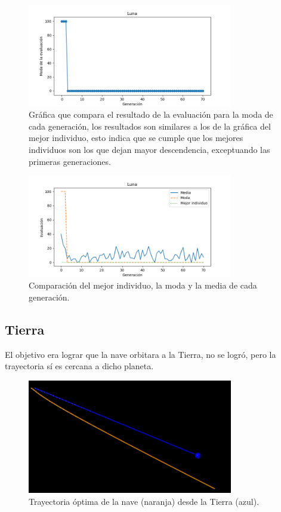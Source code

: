 \documentclass[12pt,letterpaper]{article}
\begin{document}
\begin{figure}[H]
\centering
\includegraphics[width=0.8\textwidth]{Lunamoda}
\caption{Gráfica que compara el resultado de la evaluación para la moda de cada generación, los resultados son similares a los de la gráfica del mejor individuo, esto indica que se cumple que los mejores individuos son los que dejan mayor descendencia, exceptuando las primeras generaciones.}
\end{figure}

\begin{figure}[H]
\centering
\includegraphics[width=0.8\textwidth]{Luna}
\caption{Comparación del mejor individuo, la moda y la media de cada generación.}
\end{figure}





\subsection*{Tierra}

El objetivo era lograr que la nave orbitara a la Tierra, no se logró, pero la trayectoria sí es cercana a dicho planeta. 

\begin{figure}[H]
\centering
\includegraphics[width=0.8\textwidth]{tierra}
\caption{Trayectoria óptima de la nave (naranja) desde la Tierra (azul).}
\end{figure}
\end{document}
